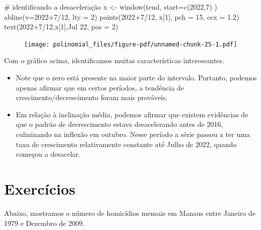\documentclass[
  letterpaper,
  DIV=11,
  numbers=noendperiod]{scrreprt}
\newenvironment{Shaded}{\begin{snugshade}}{\end{snugshade}}
\newcommand{\AttributeTok}[1]{\textcolor[rgb]{0.40,0.45,0.13}{#1}}
\newcommand{\CommentTok}[1]{\textcolor[rgb]{0.37,0.37,0.37}{#1}}
\newcommand{\DecValTok}[1]{\textcolor[rgb]{0.68,0.00,0.00}{#1}}
\newcommand{\FloatTok}[1]{\textcolor[rgb]{0.68,0.00,0.00}{#1}}
\newcommand{\FunctionTok}[1]{\textcolor[rgb]{0.28,0.35,0.67}{#1}}
\newcommand{\NormalTok}[1]{\textcolor[rgb]{0.00,0.23,0.31}{#1}}
\newcommand{\OtherTok}[1]{\textcolor[rgb]{0.00,0.23,0.31}{#1}}
\newcommand{\SpecialCharTok}[1]{\textcolor[rgb]{0.37,0.37,0.37}{#1}}
\newcommand{\StringTok}[1]{\textcolor[rgb]{0.13,0.47,0.30}{#1}}
\begin{document}
\begin{Shaded}
\begin{Highlighting}[]
\CommentTok{\# identificando a desaceleração}
\NormalTok{x }\OtherTok{\textless{}{-}} \FunctionTok{window}\NormalTok{(tend, }\AttributeTok{start=}\FunctionTok{c}\NormalTok{(}\DecValTok{2022}\NormalTok{,}\DecValTok{7}\NormalTok{) )}
\FunctionTok{abline}\NormalTok{(}\AttributeTok{v=}\DecValTok{2022}\SpecialCharTok{+}\DecValTok{7}\SpecialCharTok{/}\DecValTok{12}\NormalTok{, }\AttributeTok{lty =} \DecValTok{2}\NormalTok{)}
\FunctionTok{points}\NormalTok{(}\DecValTok{2022}\SpecialCharTok{+}\DecValTok{7}\SpecialCharTok{/}\DecValTok{12}\NormalTok{, x[}\DecValTok{1}\NormalTok{], }\AttributeTok{pch =} \DecValTok{15}\NormalTok{, }\AttributeTok{cex =} \FloatTok{1.2}\NormalTok{)}
\FunctionTok{text}\NormalTok{(}\DecValTok{2022}\SpecialCharTok{+}\DecValTok{7}\SpecialCharTok{/}\DecValTok{12}\NormalTok{,x[}\DecValTok{1}\NormalTok{],}\StringTok{\textquotesingle{}Jul 22\textquotesingle{}}\NormalTok{, }\AttributeTok{pos =} \DecValTok{2}\NormalTok{)}
\end{Highlighting}
\end{Shaded}

\begin{figure}[H]

{\centering \texttt{[image: polinomial\_files/figure-pdf/unnamed-chunk-25-1.pdf]}

}

\end{figure}

Com o gráfico acima, identificamos muitas características interessantes.

\begin{itemize}
\item
  Note que o zero está presente na maior parte do intervalo. Portanto,
  podemos apenas afirmar que em certos períodos, a tendência de
  crescimento/decrescimento foram mais prováveis.
\item
  Em relação à inclinação média, podemos afirmar que existem evidências
  de que o padrão de decrescimento estava desacelerando antes de 2016,
  culminando na inflexão em outubro. Nesse período a série passou a ter
  uma taxa de crescimento relativamente constante até Julho de 2022,
  quando começou a desacelar.
\end{itemize}

\hypertarget{exercuxedcios-4}{%
\section{Exercícios}\label{exercuxedcios-4}}

Abaixo, mostramos o número de homicídios mensais em Manaus entre Janeiro
de 1979 e Dezembro de 2009.
\end{document}
